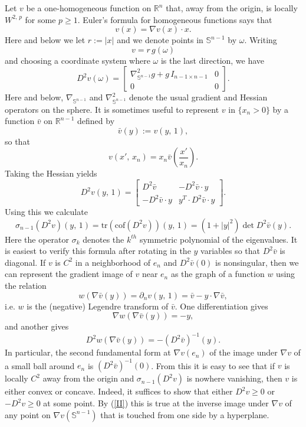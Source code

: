 \documentclass{amsart}
\theoremstyle{definition}
\theoremstyle{remark}
\begin{document}
Let $v$ be a one-homogeneous function on $\mathbb{R}^n$ that, away from the origin, is locally $W^{2,\,p}$ for some $p \geq 1$. Euler's formula for homogeneous functions says that
\begin{equation}\label{Euler}
v(x) = \nabla v(x) \cdot x.
\end{equation}
Here and below we let $r := |x|$ and we denote points in $\mathbb{S}^{n-1}$ by $\omega$. Writing 
$$v = r\,g(\omega)$$
and choosing a coordinate system where $\omega$ is the last direction, we have
\begin{equation}\label{OneHomogHessian}
D^2v(\omega) = 
 \begin{bmatrix}
     \nabla_{\mathbb{S}^{n-1}}^2g + g\,I_{n-1 \times n-1} & 0 \\ 
     0 & 0
 \end{bmatrix}.
\end{equation}
Here and below, $\nabla_{\mathbb{S}^{n-1}}$ and $\nabla_{\mathbb{S}^{n-1}}^2$ denote the usual gradient and Hessian operators on the sphere. It is sometimes useful to represent $v$ in $\{x_n > 0\}$ by a function $\bar{v}$ on $\mathbb{R}^{n-1}$ defined by
$$\bar{v}(y) := v(y,\,1),$$
so that
$$v(x',\,x_n) = x_n\bar{v}\left(\frac{x'}{x_n}\right).$$
Taking the Hessian yields 
$$D^2v(y,\,1) = 
 \begin{bmatrix}
     D^2\bar{v} & -D^2\bar{v} \cdot y \\ 
     -D^2\bar{v} \cdot y & y^T\cdot D^2\bar{v} \cdot y
 \end{bmatrix}.
 $$
Using this we calculate
\begin{equation}\label{DetRelation}
\sigma_{n-1}(D^2v)(y,\,1) = \text{tr}(\text{cof}(D^2v))(y,\,1) = (1+|y|^2)\det D^2\bar{v}(y).
\end{equation}
Here the operator $\sigma_k$ denotes the $k^{th}$ symmetric polynomial of the eigenvalues. It is easiest to verify this formula after rotating in the $y$ variables so that $D^2\bar{v}$ is diagonal.
If $v$ is $C^2$ in a neighborhood of $e_n$ and $D^2\bar{v}(0)$ is nonsingular, then we can represent the gradient image of $v$ near $e_n$ as the graph of a function $w$ using the relation
$$w(\nabla \bar{v}(y)) = \partial_nv(y,\,1) = \bar{v} - y \cdot \nabla \bar{v},$$
i.e. $w$ is the (negative) Legendre transform of $\bar{v}$. One differentiation gives
$$\nabla w(\nabla\bar{v}(y)) = -y,$$
and another gives
\begin{equation}\label{II}
D^2w(\nabla \bar{v}(y)) = -(D^2\bar{v})^{-1}(y).
\end{equation}
In particular, the second fundamental form at $\nabla v(e_n)$ of the image under $\nabla v$ of a small ball around $e_n$ is $(D^2\bar{v})^{-1}(0)$. From this it is easy to see that if $v$ is locally $C^2$ away from the origin and $\sigma_{n-1}(D^2v)$ is nowhere vanishing, then $v$ is either convex or concave. Indeed, it suffices to show that either $D^2v \geq 0$ or $-D^2v \geq 0$ at some point. By (\ref{II}) this is true at the inverse image under $\nabla v$ of any point on $\nabla v(\mathbb{S}^{n-1})$ that is touched from one side by a hyperplane.
\end{document}
